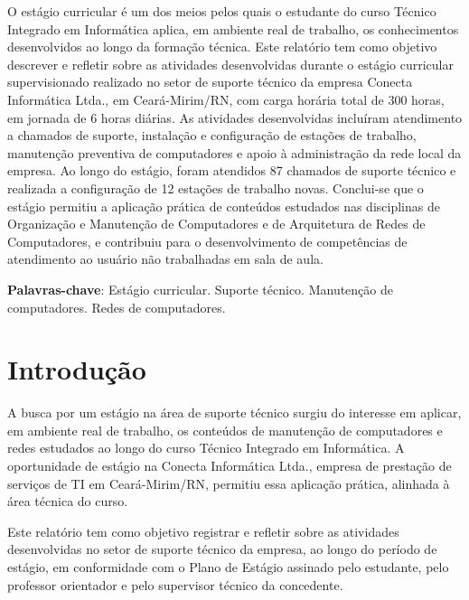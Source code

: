 \documentclass[article,12pt,a4paper,oneside]{abntex2}
\begin{document}
\maketitle

\begin{resumo}
O estágio curricular é um dos meios pelos quais o estudante do curso
Técnico Integrado em Informática aplica, em ambiente real de trabalho, os
conhecimentos desenvolvidos ao longo da formação técnica. Este relatório
tem como objetivo descrever e refletir sobre as atividades desenvolvidas
durante o estágio curricular supervisionado realizado no setor de suporte
técnico da empresa Conecta Informática Ltda., em Ceará-Mirim/RN, com carga
horária total de 300 horas, em jornada de 6 horas diárias. As atividades
desenvolvidas incluíram atendimento a chamados de suporte, instalação e
configuração de estações de trabalho, manutenção preventiva de
computadores e apoio à administração da rede local da empresa. Ao longo do
estágio, foram atendidos 87 chamados de suporte técnico e realizada a
configuração de 12 estações de trabalho novas. Conclui-se que o estágio
permitiu a aplicação prática de conteúdos estudados nas disciplinas de
Organização e Manutenção de Computadores e de Arquitetura de Redes de
Computadores, e contribuiu para o desenvolvimento de competências de
atendimento ao usuário não trabalhadas em sala de aula.

\vspace{\onelineskip}
\noindent
\textbf{Palavras-chave}: Estágio curricular. Suporte técnico. Manutenção de computadores. Redes de computadores.
\end{resumo}

\textual

\section{Introdução}

A busca por um estágio na área de suporte técnico surgiu do interesse em
aplicar, em ambiente real de trabalho, os conteúdos de manutenção de
computadores e redes estudados ao longo do curso Técnico Integrado em
Informática. A oportunidade de estágio na Conecta Informática Ltda.,
empresa de prestação de serviços de TI em Ceará-Mirim/RN, permitiu essa
aplicação prática, alinhada à área técnica do curso.

Este relatório tem como objetivo registrar e refletir sobre as atividades
desenvolvidas no setor de suporte técnico da empresa, ao longo do período
de estágio, em conformidade com o Plano de Estágio assinado pelo
estudante, pelo professor orientador e pelo supervisor técnico da
concedente.
\end{document}
